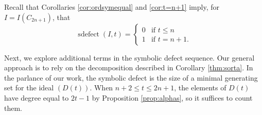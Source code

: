 \documentclass[12pt]{amsart}
\def\sdefect{\operatorname{sdefect}}
\renewcommand{\ge}{\geqslant}
\renewcommand{\le}{\leqslant}
\theoremstyle{plain}
\newtheorem{proposition}[theorem]{Proposition}
\theoremstyle{definition}
\begin{document}


Recall that Corollaries \ref{cor:ordsymequal} and \ref{cor:t=n+1} imply, for $I = I(C_{2n+1})$, that
\[
	\sdefect(I,t) = \begin{cases} 0 & \text{if } t \le n \\ 1 & \text{if } t = n+1.\end{cases}
\]

Next, we explore additional terms in the symbolic defect sequence.
Our general approach is to rely on the decomposition described in Corollary \ref{thm:sorta}.
In the parlance of our work, the symbolic defect is the size of a minimal generating set for the ideal $(D(t))$.
When $n+2\le t\le 2n+1$, the elements of $D(t)$ have degree equal to $2t-1$ by Proposition \ref{prop:alphas}, so it suffices to count them.

\begin{comment}
\begin{proposition}\label{prop:sdefect}
	Let $I = I(C_{2n+1})$.
	Then
	\[
		\sdefect(I,n+2) = 2n+1.
	\]
\end{proposition}
\begin{proof}
	As stated above, we wish to count the number of minimal generators in $S(n+2)'$.
	Recall that $\alpha(I^{(n+2)}) = 2(n+2) - \lfloor \frac{n+2}{n+1} \rfloor = 2n+3$; as all elements of $S(n+2)$ (and thus $S(n+2)'$) have degree less than $2(n+2) = 2n+4$, we see that we are merely counting the number of (linearly independent) monomials of degree $2n+3$ in $S(n+2)$.
	We know by Lemma \ref{lem:levels} that any monomial $m$ of degree $2n+3 = 2(n+2) -1$ in $S(n+2)$ is divisible by $x_1 x_2 \cdots x_{2n+1}$.
	After dividing $m$ by $x_1 x_2 \cdots x_{2n+1}$, we are left with a product $p$ of two vertices, i.e., $m = p x_1 x_2 \cdots x_{2n+1}$.
	Since $w_{V'}(m) = w_{V'}(p) + w_{V'}(x_1 x_2 \cdots x_{2n+1}) \ge n+2$ for any minimal vertex cover $V'$, we have $w_{V'}(p) \ge n+2 - w_{V'}(x_1 x_2 \cdots x_{2n+1})$.
	If $V'$ is any minimal vertex cover consisting of $n+1$ vertices, we see that $w_{V'}(p) \ge 1$, and thus $p$ must be a product of variables corresponding to adjacent vertices, i.e., $p$ is an edge.
	As there are $2n+1$ edges in $C_{2n+1}$, there are $2n+1$ choices for $p$, i.e., $\sdefect(I,n+2) = 2n+1$.
\end{proof}
\end{comment}
\end{document}
